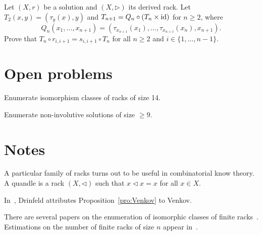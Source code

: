\begin{prob}
\label{prob:guitar}
Let $(X,r)$ be a solution and $(X,\triangleright)$ its derived rack. Let $T_2(x,y)=(\tau_y(x),y)$ and
$T_{n+1}=Q_n\circ (T_n\times\operatorname{id})$ for $n\geq2$, where 
\[
Q_n(x_1,\dots,x_{n+1})=(\tau_{x_{n+1}}(x_1),\dots,\tau_{x_{n+1}}(x_n),x_{n+1}).
\]
Prove that $T_n\circ r_{i,i+1}=s_{i,i+1}\circ T_n$ for all $n\geq2$ and $i\in\{1,\dots,n-1\}$. 
\end{prob}

\section*{Open problems}

\begin{problem}
\label{problem:racks14}
Enumerate isomorphism classes of racks of size 14. 
\end{problem}

\begin{problem}
Enumerate non-involutive solutions of size $\geq9$. 
\end{problem}


\section*{Notes}

A particular family of racks turns out to be useful in combinatorial know theory. A quandle
is a rack $(X,\triangleleft)$ such that $x\triangleleft x=x$ for all $x\in X$. 

In~\cite{MR1183474}, Drinfeld attributes Proposition~\ref{pro:Venkov} to Venkov. 

There are several papers on the enumeration of isomorphic classes of finite racks~\cite{MR3665565,MR3118951,MR3904151}. 
Estimations on the number of finite
racks of size $n$ appear in~\cite{MR3118951}. 

